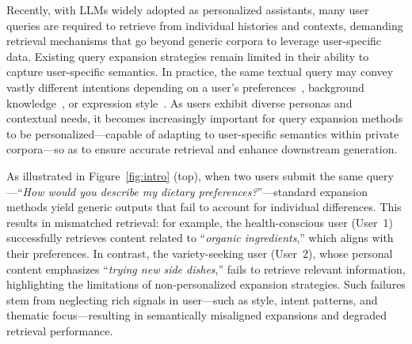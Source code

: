 Recently, with LLMs widely adopted as personalized assistants, many user queries are required to retrieve from individual histories and contexts, demanding retrieval mechanisms that go beyond generic corpora to leverage user-specific data.
Existing query expansion strategies remain limited in their ability to capture user-specific semantics. 
In practice, the same textual query may convey vastly different intentions depending on a user’s preferences~\cite{zou2023users}, background knowledge~\cite{westhofen2025temporal}, or expression style~\cite{neelakanteswara2024rags}. As users exhibit diverse personas and contextual needs, it becomes increasingly important for query expansion methods to be personalized—capable of adapting to user-specific semantics within private corpora—so as to ensure accurate retrieval and enhance downstream generation.

As illustrated in Figure~\ref{fig:intro} (top), when two users submit the same query—``\emph{How would you describe my dietary preferences?}''—standard expansion methods yield generic outputs that fail to account for individual differences. This results in mismatched retrieval: for example, the health-conscious user (User~1) successfully retrieves content related to ``\emph{organic ingredients},'' which aligns with their preferences. In contrast, the variety-seeking user (User~2), whose personal content emphasizes ``\emph{trying new side dishes},'' fails to retrieve relevant information, highlighting the limitations of non-personalized expansion strategies. Such failures stem from neglecting rich signals in user—such as style, intent patterns, and thematic focus—resulting in semantically misaligned expansions and degraded retrieval performance.


